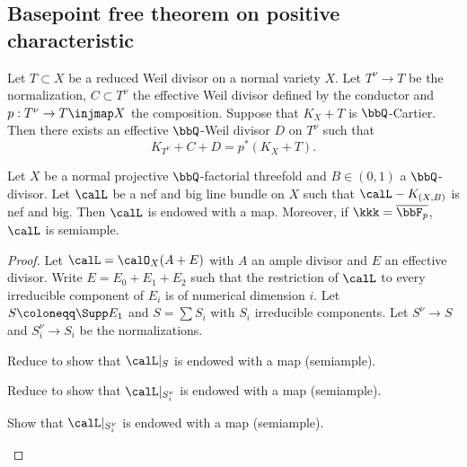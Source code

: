 \subsection{Basepoint free theorem on positive characteristic}

    \begin{proposition}\label{prop:adjunction_bpf_char_p}
        Let \(T \subset X\) be a reduced Weil divisor on a normal variety \(X\).
        Let \(T^\nu \to T\) be the normalization, \(C\subset T^\nu\) the effective Weil divisor defined by the conductor and \(p:T^\nu \to T \injmap X\) the composition.
        Suppose that \(K_X + T\) is \(\bbQ\)-Cartier.
        Then there exists an effective \(\bbQ\)-Weil divisor \(D\) on \(T^\nu\) such that 
        \[ K_{T^\nu} + C + D = p^*(K_X + T). \]
    \end{proposition}

    \begin{theorem}\label{thm:basepoint_free_nef_big_char_p}
        Let $X$ be a normal projective \(\bbQ\)-factorial threefold and \(B \in (0,1)\) a \(\bbQ\)-divisor.
        Let \(\calL\) be a nef and big line bundle on \(X\) such that \(\calL - K_{(X,B)}\) is nef and big.
        Then \(\calL\) is endowed with a map.
        Moreover, if \(\kkk = \overline{\bbF_p}\), \(\calL\) is semiample.
    \end{theorem}
    \begin{proof}
        Let \(\calL=\calO_X(A+E)\) with \(A\) an ample divisor and \(E\) an effective divisor.
        Write \(E = E_0 + E_1 + E_2\) such that the restriction of \(\calL\) to every irreducible component of \(E_i\) is of numerical dimension \(i\).
        Let \(S \coloneqq \Supp E_1\) and \(S = \sum S_i\) with \(S_i\) irreducible components.
        Let \(S^\nu \to S\) and \(S_i^\nu \to S_i\) be the normalizations.
       
        \begin{step}
            Reduce to show that \(\calL|_{S}\) is endowed with a map (semiample).
        \end{step}

        \begin{step}
            Reduce to show that \(\calL|_{S_i^\nu}\) is endowed with a map (semiample).
        \end{step}

        \begin{step}
            Show that \(\calL|_{S_i^\nu}\) is endowed with a map (semiample).
        \end{step}

    \end{proof}


    